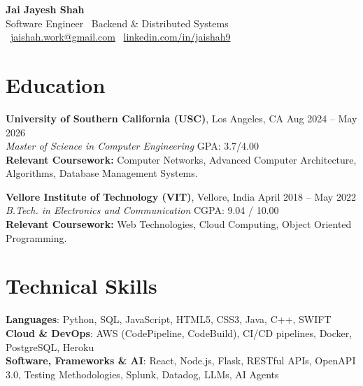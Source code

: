 \documentclass[letterpaper,11pt]{article}
\begin{document}
\begin{center}
    {\LARGE \textbf{Jai Jayesh Shah}}\\
    {\normalsize Software Engineer \textbar\ Backend \& Distributed Systems}\\
    \small
    \faEnvelope\ \href{mailto:jaishah.work@gmail.com}{jaishah.work@gmail.com}
    \quad
    \faLinkedin\ \href{https://www.linkedin.com/in/jaishah9}{linkedin.com/in/jaishah9}
\end{center}
\vspace{-13pt}


\section*{Education}
\textbf{University of Southern California (USC)}, Los Angeles, CA \hfill Aug 2024 -- May 2026 \\
\textit{Master of Science in Computer Engineering} \hfill GPA: 3.7/4.00 \\
\textbf{Relevant Coursework:} Computer Networks, Advanced Computer Architecture, Algorithms, Database Management Systems.

\vspace{3pt}
\textbf{Vellore Institute of Technology (VIT)}, Vellore, India \hfill April 2018 -- May 2022 \\
\textit{B.Tech. in Electronics and Communication} \hfill CGPA: 9.04 / 10.00 \\
\textbf{Relevant Coursework:} Web Technologies, Cloud Computing, Object Oriented Programming.

\section*{Technical Skills}
\begin{itemize}[leftmargin=0.15in, label={}]
    {\item{
     \textbf{Languages}{: Python, SQL, JavaScript, HTML5, CSS3, Java, C++, SWIFT} \\
     \textbf{Cloud \& DevOps}{: AWS (CodePipeline, CodeBuild), CI/CD pipelines, Docker, PostgreSQL, Heroku} \\
     \textbf{Software, Frameworks \& AI}{: React, Node.js, Flask, RESTful APIs, OpenAPI 3.0, Testing Methodologies, Splunk, Datadog, LLMs, AI Agents}
    }}
\end{itemize}

\end{document}
